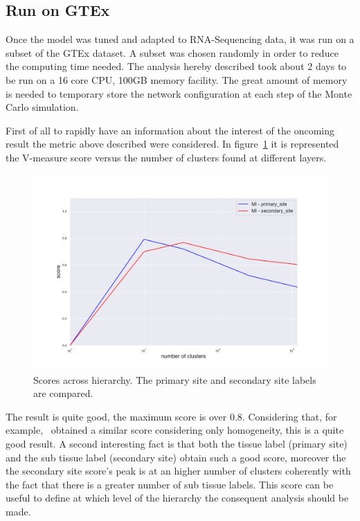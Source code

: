 \subsection{Run on GTEx}
Once the model was tuned and adapted to RNA-Sequencing data, it was run on a subset of the GTEx dataset. A subset was chosen randomly in order to reduce the computing time needed. The analysis hereby described took about 2 days to be run on a 16 core CPU, 100GB memory facility. The great amount of memory is needed to temporary store the network configuration at each step of the Monte Carlo simulation.

First of all to rapidly have an information about the interest of the oncoming result the metric above described were considered. In figure~\ref{fig:topic/gtex/oversigma_10tissue/metric_scores} it is represented the V-measure score versus the number of clusters found at different layers.
\begin{figure}[htb!]
    \centering
    \includegraphics[width=0.9\linewidth]{pictures/topic/gtex/oversigma_10tissue/metric_scores.pdf}
    \caption{Scores across hierarchy. The primary site and secondary site labels are compared.}
    \label{fig:topic/gtex/oversigma_10tissue/metric_scores}
\end{figure}
The result is quite good, the maximum score is over $0.8$. Considering that, for example,~\cite{Farver2018} obtained a similar score considering only homogeneity, this is a quite good result. A second interesting fact is that both the tissue label (primary site) and the sub tissue label (secondary site) obtain such a good score, moreover the the secondary site score's peak is at an higher number of clusters coherently with the fact that there is a greater number of sub tissue labels.
This score can be useful to define at which level of the hierarchy the consequent analysis should be made.

